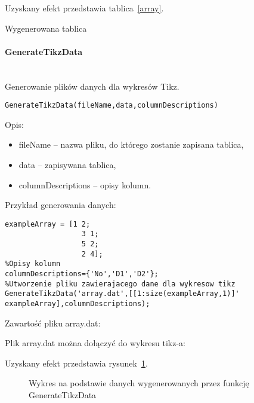 Uzyskany efekt przedstawia tablica~\ref{array}.

\begin{table}

\caption{Wygenerowana tablica}
\label{array}
\end{table}

\paragraph{GenerateTikzData} \hspace{0pt} \\
Generowanie plików danych dla wykresów Tikz.
\begin{lstlisting}[style=Matlab-editor]
GenerateTikzData(fileName,data,columnDescriptions)
\end{lstlisting}

Opis:
\begin{itemize}
\item fileName -- nazwa pliku, do którego zostanie zapisana tablica,
\item data -- zapisywana tablica,
\item columnDescriptions -- opisy kolumn.
\end{itemize}

Przykład generowania danych: 
\begin{lstlisting}[style=Matlab-editor]
%Tablica
exampleArray = [1 2;
                  3 1;
                  5 2;
                  2 4];
%Opisy kolumn
columnDescriptions={'No','D1','D2'};
%Utworzenie pliku zawierajacego dane dla wykresow tikz
GenerateTikzData('array.dat',[[1:size(exampleArray,1)]' exampleArray],columnDescriptions);
\end{lstlisting}

Zawartość pliku array.dat:


Plik array.dat można dołączyć do wykresu tikz-a: 


Uzyskany efekt przedstawia rysunek~\ref{Fig:array}.

\begin{figure}

\caption{Wykres na podstawie danych wygenerowanych przez funkcję GenerateTikzData}
\label{Fig:array}
\end{figure}


